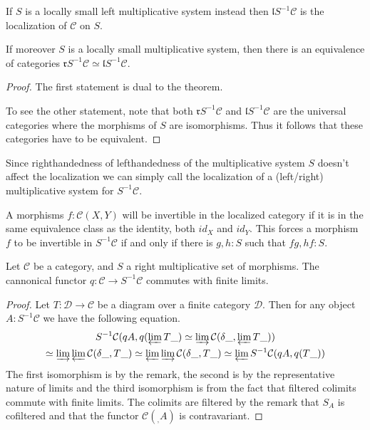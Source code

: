     \begin{corollary}
        If $S$ is a locally small left multiplicative system instead then $\mathfrak{l}S^{-1}\mathcal{C}$ is the localization of $\mathcal{C}$ on $S$.

        If moreover $S$ is a locally small multiplicative system, then there is an equivalence of categories $\mathfrak{r}S^{-1}\mathcal{C}\simeq\mathfrak{l}S^{-1}\mathcal{C}$.
    \end{corollary}

    \begin{proof}
        The first statement is dual to the theorem.

        To see the other statement, note that both $\mathfrak{r}S^{-1}\mathcal{C}$ and $\mathfrak{l}S^{-1}\mathcal{C}$ are the universal categories where the morphisms of $S$ are isomorphisms. Thus it follows that these categories have to be equivalent.
    \end{proof}

    \begin{remark}
        Since righthandedness of lefthandedness of the multiplicative system $S$ doesn't affect the localization we can simply call the localization of a (left/right) multiplicative system for $S^{-1}\mathcal{C}$.
    \end{remark}

    \begin{remark}
        A morphisms $f:\mathcal{C}(X,Y)$ will be invertible in the localized category if it is in the same equivalence class as the identity, both $id_X$ and $id_Y$. This forces a morphism $f$ to be invertible in $S^{-1}\mathcal{C}$ if and only if there is $g,h:S$ such that $fg,hf:S$.
    \end{remark}

    \begin{prop}
        Let $\mathcal{C}$ be a category, and $S$ a right multiplicative set of morphisms. The cannonical functor $q:\mathcal{C}\rightarrow S^{-1}\mathcal{C}$ commutes with finite limits.
    \end{prop}

    \begin{proof}
        Let $T:\mathcal{D}\rightarrow\mathcal{C}$ be a diagram over a finite category $\mathcal{D}$. Then for any object $A:S^{-1}\mathcal{C}$ we have the following equation.
        \begin{multline*}
            S^{-1}\mathcal{C}(qA,q(\varprojlim T\_)\simeq \varinjlim\mathcal{C}(\delta\_,\varprojlim T\_))\\
            \simeq \varinjlim\varprojlim\mathcal{C}(\delta\_,T\_)\simeq \varprojlim\varinjlim\mathcal{C}(\delta\_,T\_)\simeq \varprojlim S^{-1}\mathcal{C}(qA,q(T\_))
        \end{multline*}
        The first isomorphism is by the remark, the second is by the representative nature of limits and the third isomorphism is from the fact that filtered colimits commute with finite limits. The colimits are filtered by the remark that $S_A$ is cofiltered and that the functor $\mathcal{C}(_,A)$ is contravariant.
    \end{proof}

